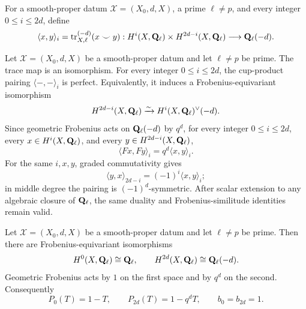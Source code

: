 
\begin{definition}
\label{def:poincare-trace-pairing}


For a smooth-proper datum \(\mathscr X=(X_0,d,X)\), a prime \(\ell\neq p\),
and every integer \(0\leq i\leq2d\), define
\[
 \langle x,y\rangle_i=
 \operatorname{tr}^{(-d)}_{X,\ell}(x\smile y):
 H^i(X,\mathbf Q_{\ell})\times H^{2d-i}(X,\mathbf Q_{\ell})
 \longrightarrow\mathbf Q_{\ell}(-d).
\]
\end{definition}


\begin{proposition}
\label{prop:poincare-pairing}


Let \(\mathscr X=(X_0,d,X)\) be a smooth-proper datum and let
\(\ell\neq p\) be prime.  The trace map is an isomorphism.  For every
integer \(0\leq i\leq2d\), the cup-product pairing
\(\langle-,-\rangle_i\) is perfect.  Equivalently, it induces a
Frobenius-equivariant isomorphism
\[
 H^{2d-i}(X,\mathbf Q_{\ell})
 \xrightarrow{\sim}H^i(X,\mathbf Q_{\ell})^\vee(-d).
\]
Since geometric Frobenius acts on \(\mathbf Q_{\ell}(-d)\) by \(q^d\), for every integer
\(0\leq i\leq2d\), every \(x\in H^i(X,\mathbf Q_{\ell})\), and every
\(y\in H^{2d-i}(X,\mathbf Q_{\ell})\),
\[
 \langle Fx,Fy\rangle_i=q^d\langle x,y\rangle_i.
\]
For the same \(i,x,y\), graded commutativity gives
\[
 \langle y,x\rangle_{2d-i}=(-1)^i\langle x,y\rangle_i;
\]
in middle degree the pairing is \((-1)^d\)-symmetric.
After scalar extension to any algebraic closure of \(\mathbf Q_{\ell}\), the same
duality and Frobenius-similitude identities remain valid.
\end{proposition}


\begin{proposition}
\label{prop:endpoints}


Let \(\mathscr X=(X_0,d,X)\) be a smooth-proper datum and let
\(\ell\neq p\) be prime.  Then there are Frobenius-equivariant isomorphisms
\[
 H^0(X,\mathbf Q_{\ell})\cong\mathbf Q_{\ell},
 \qquad
 H^{2d}(X,\mathbf Q_{\ell})\cong\mathbf Q_{\ell}(-d).
\]
Geometric Frobenius acts by \(1\) on the first space and by \(q^d\) on the
second.  Consequently
\[
 P_0(T)=1-T,
 \qquad
 P_{2d}(T)=1-q^dT,
 \qquad
 b_0=b_{2d}=1.
\]
\end{proposition}


